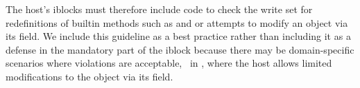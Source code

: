 {\begin{mylist}
The host's iblocks must therefore include code to check the write set for
redefinitions of builtin methods such as  and  or
attempts to modify an object via its  field. We include this
guideline as a best practice rather than including it as a defense in the
mandatory part of the iblock because there may be domain-specific scenarios
where violations are acceptable, \eg~in , where the
host allows limited modifications to the  object via its
 field.
%
\end{mylist} 
}